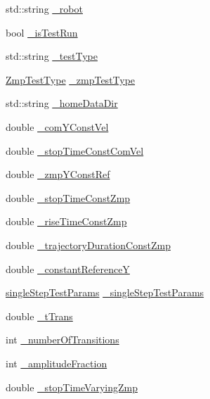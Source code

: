\begin{DoxyCompactItemize}
\item 
std\-::string \hyperlink{classWalkingClient_a67461634d7e8cb0234400b34fd2865e7}{\-\_\-robot}
\item 
bool \hyperlink{classWalkingClient_a4f9c8688537ddd8a487a212fbb279a9b}{\-\_\-is\-Test\-Run}
\item 
std\-::string \hyperlink{classWalkingClient_a35c00feb4e7dfa532e43241e855fec89}{\-\_\-test\-Type}
\item 
\hyperlink{utils_8h_afc01479a47f5a87462a54b6a9e11fffa}{\-Zmp\-Test\-Type} \hyperlink{classWalkingClient_a14576258d7fed1b36919145f1b56d74c}{\-\_\-zmp\-Test\-Type}
\item 
std\-::string \hyperlink{classWalkingClient_ade3bf018661152fc0404d3973ea30783}{\-\_\-home\-Data\-Dir}
\item 
double \hyperlink{classWalkingClient_a4e448bc147b41d97e0f17af6ebb0020f}{\-\_\-com\-Y\-Const\-Vel}
\item 
double \hyperlink{classWalkingClient_a9f19b1a1184cbdbf883cc374c6b6b88f}{\-\_\-stop\-Time\-Const\-Com\-Vel}
\item 
double \hyperlink{classWalkingClient_a6cba3194816a0be78a8b17d539806115}{\-\_\-zmp\-Y\-Const\-Ref}
\item 
double \hyperlink{classWalkingClient_a58b08317f6d8b825a21e1db8c7f0ff32}{\-\_\-stop\-Time\-Const\-Zmp}
\item 
double \hyperlink{classWalkingClient_aab1bac82d66908def9a36bede6bb24e2}{\-\_\-rise\-Time\-Const\-Zmp}
\item 
double \hyperlink{classWalkingClient_aa6b3bf5c2ed923a7a33a9ed461713d98}{\-\_\-trajectory\-Duration\-Const\-Zmp}
\item 
double \hyperlink{classWalkingClient_a7d15e2b9c9ada337280c46d6aadb54f8}{\-\_\-constant\-Reference\-Y}
\item 
\hyperlink{structsingleStepTestParams}{single\-Step\-Test\-Params} \hyperlink{classWalkingClient_a92adc07ae5221e5dde31483fe5d2deae}{\-\_\-single\-Step\-Test\-Params}
\item 
double \hyperlink{classWalkingClient_a144518766ec4eb9eeab230fcb291e20c}{\-\_\-t\-Trans}
\item 
int \hyperlink{classWalkingClient_aefb4ed994a32879a526f2bc8c962927f}{\-\_\-number\-Of\-Transitions}
\item 
int \hyperlink{classWalkingClient_ac548ce03ea9ceffb4b42981942f66dd0}{\-\_\-amplitude\-Fraction}
\item 
double \hyperlink{classWalkingClient_a2ed3837afa0c366f1cdef16b2a99b761}{\-\_\-stop\-Time\-Varying\-Zmp}

\end{DoxyCompactItemize}
